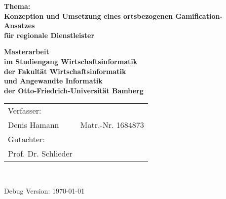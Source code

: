 \begin{titlepage}

{\sffamily
\vspace*{1cm}
\begin{center}
	\bfseries
	\Large {Thema:\\Konzeption und Umsetzung eines ortsbezogenen Gamification-Ansatzes\\
	für regionale Dienstleister}
\end{center}
\vspace{1cm}
\begin{center}

	{\large\bfseries Masterarbeit\\[5mm]}
	\vspace*{2cm}
	{\large\bfseries im Studiengang Wirtschaftsinformatik\\[5mm]}
	{\large\bfseries der Fakultät Wirtschaftsinformatik\\[5mm]}
	{\large\bfseries und Angewandte Informatik\\[5mm]}
	{\large\bfseries der Otto-Friedrich-Universität Bamberg\\[5mm]}


\end{center}
}

\vspace*{3cm}
\begin{large}

\begin{tabular}{ll}
		Verfasser:\\
		Denis Hamann & Matr.-Nr. 1684873 \\[3mm]
		
		Gutachter:\\
		Prof. Dr. Schlieder\\[3mm]


\end{tabular}\\[0.5cm]

\end{large}
{\footnotesize Debug Version: \today }


\end{titlepage}